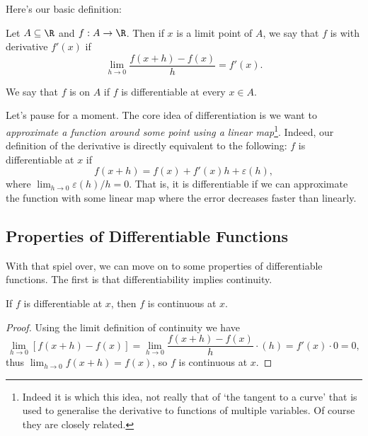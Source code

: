 \documentclass[a4paper]{scrartcl}
\begin{document}
Here's our basic definition:

\begin{definition}[Differentiability]
	Let $A \subseteq \R$ and $f: A \rightarrow \R$. 
	Then if $x$ is a limit point of $A$, we say that $f$ is  with derivative $f'(x)$ if
	$$
	\lim_{h \to 0} \frac{f(x + h) - f(x)}{h} = f'(x).
	$$

	We say that $f$ is  on $A$ if $f$ is differentiable at every $x \in A$.
\end{definition}

Let's pause for a moment. The core idea of differentiation is 
we want to \emph{approximate a function around some point using a linear map}\footnote{Indeed it is which this idea, not really that of `the tangent to a curve' that is used to generalise the derivative to functions of multiple variables. Of course they are closely related.}. Indeed, our definition of the derivative is directly equivalent to the following: $f$ is differentiable at $x$ if
$$
	f(x + h) = f(x) + f'(x)h + \varepsilon(h),
$$
where $\lim_{h\to 0} \varepsilon(h)/h = 0$. That is, it is differentiable if we can approximate the function with some linear map where the error decreases faster than linearly.



\subsection{Properties of Differentiable Functions}

With that spiel over, we can move on to some properties of differentiable functions. The first is that differentiability implies continuity.

\begin{proposition}
	If $f$ is differentiable at $x$, then $f$ is continuous at $x$.
\end{proposition}
\begin{proof}
	Using the limit definition of continuity we have
	$$\lim_{h \to 0} \left[f(x + h) - f(x)\right] = \lim_{h \to 0} \frac{f(x + h) - f(x)}{h} \cdot (h) = f'(x) \cdot 0 = 0,
	$$
	thus $\lim_{h \to 0} f(x + h) = f(x)$, so $f$ is continuous at $x$.
\end{proof}
\end{document}
